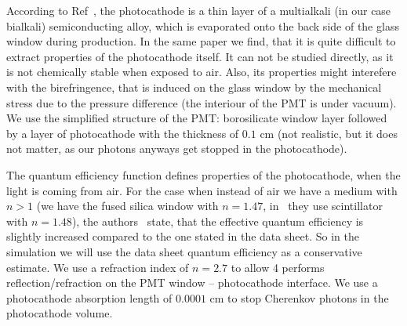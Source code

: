 According to Ref~\cite{pcpaper}, the photocathode is a thin layer of a multialkali (in our case bialkali) semiconducting alloy, which is evaporated onto the back side of the glass window during production. In the same paper we find, that it is quite difficult to extract properties of the photocathode itself. It can not be studied directly, as it is not chemically stable when exposed to air. Also, its properties might interefere with the birefringence, that is induced on the glass window by the mechanical stress due to the pressure difference (the interiour of the PMT is under vacuum). We use the simplified structure of the PMT: borosilicate window layer followed by a layer of photocathode with the thickness of $0.1$ cm (not realistic, but it does not matter, as our photons anyways get stopped in the photocathode). 

The quantum efficiency function defines properties of the photocathode, when the light is coming from air. For the case when instead of air we have a medium with $n > 1$ (we have the fused silica window with $n = 1.47$, in~\cite{pcpaper} they use scintillator with $n = 1.48$), the authors~\cite{pcpaper} state, that the effective quantum efficiency is slightly increased compared to the one stated in the data sheet. So in the simulation we will use the data sheet quantum efficiency as a conservative estimate. We use a refraction index of $n = 2.7$ to allow {\geant}4 performs reflection/refraction on the PMT window -- photocathode interface. We use a photocathode absorption length of $0.0001$ cm to stop Cherenkov photons in the photocathode volume.





